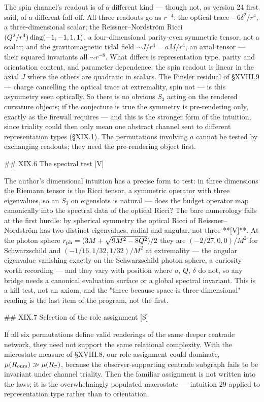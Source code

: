 The spin channel's readout is of a different kind — though not, as version 24 first said, of a different fall-off. All three readouts go as $r^{-4}$: the optical trace $-6\delta^2/r^4$, a three-dimensional scalar; the Reissner–Nordström Ricci $(Q^2/r^4)\,{\rm diag}(-1,-1,1,1)$, a four-dimensional parity-even symmetric tensor, not a scalar; and the gravitomagnetic tidal field $\sim J/r^4 = aM/r^4$, an axial tensor — their squared invariants all $\sim r^{-8}$. What differs is representation type, parity and orientation content, and parameter dependence: the spin readout is linear in the axial $J$ where the others are quadratic in scalars. The Finsler residual of §XVIII.9 — charge cancelling the optical trace at extremality, spin not — is this asymmetry seen optically. So there is no obvious $S_3$ acting on the rendered curvature objects; if the conjecture is true the symmetry is pre-rendering only, exactly as the firewall requires — and this is the stronger form of the intuition, since triality could then only mean one abstract channel sent to different representation types (§XIX.1). The permutations involving $a$ cannot be tested by exchanging readouts; they need the pre-rendering object first.

## XIX.6 The spectral test [V]

The author's dimensional intuition has a precise form to test: in three dimensions the Riemann tensor is the Ricci tensor, a symmetric operator with three eigenvalues, so an $S_3$ on eigenslots is natural — does the budget operator map canonically into the spectral data of the optical Ricci? The bare numerology fails at the first hurdle: by spherical symmetry the optical Ricci of Reissner–Nordström has two distinct eigenvalues, radial and angular, not three **[V]**. At the photon sphere $r_{\rm ph} = (3M+\sqrt{9M^2-8Q^2})/2$ they are $(-2/27,0,0)/M^2$ for Schwarzschild and $(-1/16,1/32,1/32)/M^2$ at extremality — the angular eigenvalue vanishing exactly on the Schwarzschild photon sphere, a curiosity worth recording — and they vary with position where $a$, $Q$, $\delta$ do not, so any bridge needs a canonical evaluation surface or a global spectral invariant. This is a kill test, not an axiom, and the "three because space is three-dimensional" reading is the last item of the program, not the first.

## XIX.7 Selection of the role assignment [S]

If all six permutations define valid renderings of the same deeper centrade network, they need not support the same relational complexity. With the microstate measure of §XVIII.8, our role assignment could dominate, $\mu(R_{\rm ours})\gg\mu(R_\pi)$, because the observer-supporting centrade subgraph fails to be invariant under channel triality. Then the familiar assignment is not written into the laws; it is the overwhelmingly populated macrostate — intuition 29 applied to representation type rather than to orientation.

